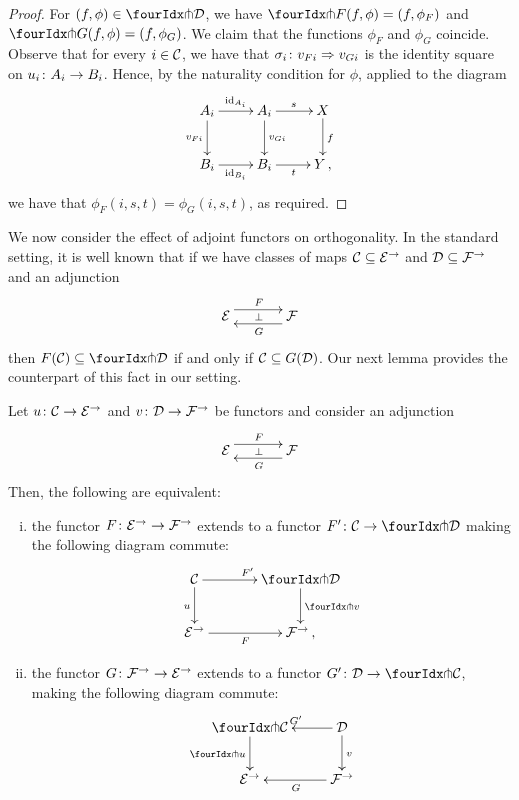 \documentclass[reqno,10pt,a4paper,oneside]{amsart}
\begin{document}
\begin{proof} For $(f, \phi) \in \liftr{\cal{D}}$, we have $\liftr{F}(f, \phi) = (f, \phi_F)$ and $\liftr{G}(f, \phi) = (f, \phi_G)$.
We claim that the functions $\phi_F$ and $\phi_G$ coincide. Observe that 
for every $i \in \cal{C}$, we have that $\sigma_i \co v_{Fi}  \Rightarrow v_{Gi}$ is the identity square on $u_i
\co A_i \to B_i$. Hence, by the naturality condition for $\phi$, applied to the diagram 
\[
\xymatrix{
A_i \ar[r]^{\id_{A_i}} \ar[d]_{v_{Fi}}  & A_i \ar[d]^{v_{Gi}} \ar[r]^{s}  & X \ar[d]^{f} \\
B_i \ar[r]_{\id_{B_i}} & B_i \ar[r]_{t} & Y \, ,}
\]
we have  that $\phi_F(i, s, t) = \phi_G(i, s, t)$, as required.
\end{proof} 

\medskip

We now consider the effect of adjoint functors on orthogonality. In the standard setting, it is well known that if 
we have classes of maps $\cal{C} \subseteq \cal{E}^\to$ and $\cal{D} \subseteq \cal{F}^\to$ and an adjunction
\[
\xymatrix@C+1em{
  \cal{E}
  \ar@<5pt>[r]^{F}
  \ar@{}[r]|{\bot}
&
  \cal{F}
  \ar@<5pt>[l]^{G}
}
\]
then $F(\cal{C}) \subseteq \liftl{\cal{D}}$ if and only if $\cal{C} \subseteq G(\cal{D})$. Our next lemma provides the counterpart of this fact in our setting.




\begin{proposition} \label{lift-of-adjunction} 
Let $u \co \cal{C} \to \cal{E}^{\to}$ and $v \co \cal{D} \to \cal{F}^{\to}$ be functors and consider an adjunction
\[
\xymatrix@C+1em{
  \cal{E}
  \ar@<5pt>[r]^{F}
  \ar@{}[r]|{\bot}
&
  \cal{F}
  \ar@<5pt>[l]^{G}
}
\]
Then, the following are equivalent:
\begin{enumerate}[(i)] 
\item the  functor $F \co \cal{E}^\to \to \cal{F}^\to$ extends to a functor $F' \co \cal{C} \to \liftl{\cal{D}}$ making the following diagram commute:
\[
\xymatrix@C=1.2cm{
  \cal{C}
  \ar[r]^{F'}
  \ar[d]_{u}
&
  \liftl{\cal{D}}
  \ar[d]^{\liftl{v}}
\\
  \cal{E}^{\to}
  \ar[r]_-{F}
&
  \cal{F}^{\to}\, ,}
\]
\item the functor $G \co \cal{F}^\to \to \cal{E}^\to$ extends to a functor $G' \co \cal{D} \to \liftr{\cal{C}}$, making the following diagram commute:
\[
\xymatrix{
  \liftr{\cal{C}}
  \ar[d]_{\liftr{u}}
&
  \cal{D}
  \ar[l]_{G'} 
  \ar[d]^{v}
\\
  \cal{E}^{\to}
&
  \cal{F}^{\to}
  \ar[l]^{G}
}
\]
\end{enumerate}
\end{proposition}
\end{document}
